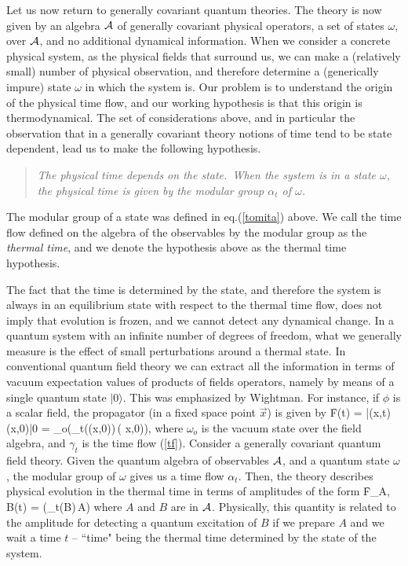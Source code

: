 Let us now return to generally covariant quantum theories.  The
theory is now given by an algebra $\cal A$ of generally covariant
physical operators, a set of states $\omega$, over $\cal A$, and
no additional dynamical information.  When we consider a
concrete physical system, as the physical fields that surround
us, we can make a (relatively small) number of physical
observation, and therefore determine a (generically impure) state
$\omega$ in which the system is.    Our problem is to
understand the origin of the physical time flow, and our working
hypothesis is that this origin is thermodynamical.  The set of
considerations above, and in particular the observation that in a
generally covariant theory notions of time tend to be state
dependent, lead us to make the following hypothesis.
\begin{quote}
\em The physical time depends on the state.\  When the system
is in a state $\omega$, the physical time is given by the modular
group $\alpha_t$ of $\omega$.
\end{quote}
The modular group of a state was defined in eq.(\ref{tomita})
above. We call the time flow defined on the algebra of the
observables by the modular group as the {\it thermal time}, and
we denote the hypothesis above as the thermal time hypothesis.

The fact that the time is determined by the state, and therefore
the system is always in an equilibrium state with respect to the
thermal time flow, does not imply that evolution is frozen, and
we cannot detect any dynamical change.  In a quantum system
with an infinite number of degrees of freedom, what we generally
measure is the effect of small perturbations around a thermal
state.   In conventional quantum field theory we can extract
all the information in terms of vacuum expectation values of
products of fields operators, namely by means of a single
quantum state $|0\rangle$. This was emphasized by Wightman. For
instance, if $\phi$ is a scalar field, the propagator (in a fixed
space point $\vec x$) is given by
\f
	F(t) 	= |\phi(\vec x,t)\phi(\vec x,0)|0\rangle
		=  \omega_o(\gamma_t(\phi(\vec x,0))\,\phi(\vec
x,0)),
\ff
where $\omega_o$ is the vacuum state over the field algebra, and
$\gamma_t$ is the time flow (\ref{tf}).  Consider a generally
covariant quantum field theory.  Given the quantum algebra of
observables $\cal A$, and a quantum state $\omega$, the modular
group of $\omega$ gives us a time flow $\alpha_t$.  Then, the
theory describes physical evolution in the thermal time in terms
of amplitudes of the form
\f
	F_{A, B}(t) = \omega(\alpha_t(B)\,A)
\ff
where $A$ and $B$ are in $\cal A$. Physically, this quantity is
related to the amplitude for detecting a quantum excitation of
$B$ if we prepare $A$ and we wait a time $t$ -- ``time" being
the thermal time determined by the state of the system.

